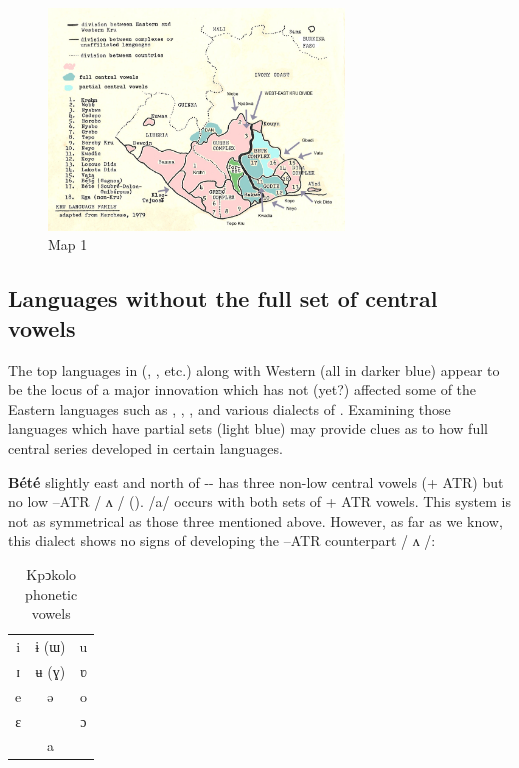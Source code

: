 \documentclass[output=paper
,newtxmath
,modfonts
,nonflat]{langsci/langscibook}
\begin{document}
\begin{figure}
\includegraphics[width=0.7\textwidth]{figures/fig-zogbo-1.png}
\caption*{Map 1}
\end{figure} 

\subsection{Languages without the full set of central vowels}\label{sec:zogbo:2.2} 

The top languages in  (,  , etc.) along with Western  (all in darker blue) appear to be the locus of a major innovation which has not (yet?) affected some of the Eastern languages such as , , , and various dialects of . Examining those languages which have partial sets (light blue) may provide clues as to how full central series developed in certain languages. 

\textbf{ Bété} slightly east and north of -- has three non-low central vowels (+ ATR) but no low –ATR / ʌ / (\citealt{Zogbo2005}). /a/ occurs with both sets of + ATR vowels. This system is not as symmetrical as those three mentioned above. However, as far as we know, this dialect shows no signs of developing the –ATR counterpart / ʌ /: 

\begin{table}
\begin{tabular}{ccc}
i  &  ɨ (ɯ) &   u\\

ɪ  &  ʉ (ɣ)  &  ʋ\\

e  &  ə  &  o\\

ɛ  &   &   ɔ\\

&a&\\
\end{tabular}
\caption{Kpↄkolo phonetic vowels}
\label{tab:zogbo:11}
\end{table}
\end{document}
